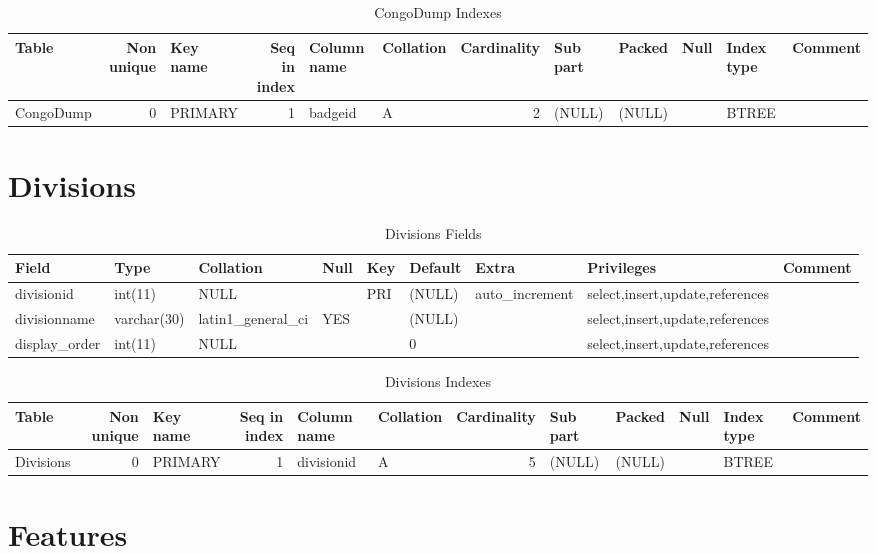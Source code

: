 \documentclass[captions=tablesignature]{scrartcl}
\begin{document}
\begin{table}[htb]
\caption{\label{tbl:congodumpindexes}CongoDump Indexes}
\centering
\begin{tabular}{lrlrllrlllll}
\hline
Table & Non unique & Key name & Seq in index & Column name & Collation & Cardinality & Sub part & Packed & Null & Index type & Comment\\
\hline
CongoDump & 0 & PRIMARY & 1 & badgeid & A & 2 & (NULL) & (NULL) &  & BTREE & \\
\hline
\end{tabular}
\end{table}
\section{Divisions}
\label{sec-2}

\begin{table}[htb]
\caption{\label{tbl:divisionsfields}Divisions Fields}
\centering
\begin{tabular}{lllllllll}
\hline
Field & Type & Collation & Null & Key & Default & Extra & Privileges & Comment\\
\hline
divisionid & int(11) & NULL &  & PRI & (NULL) & auto\_increment & select,insert,update,references & \\
divisionname & varchar(30) & latin1\_general\_ci & YES &  & (NULL) &  & select,insert,update,references & \\
display\_order & int(11) & NULL &  &  & 0 &  & select,insert,update,references & \\
\hline
\end{tabular}
\end{table}

\begin{table}[htb]
\caption{\label{tbl:Divisionsindexes}Divisions Indexes}
\centering
\begin{tabular}{lrlrllrlllll}
\hline
Table & Non unique & Key name & Seq in index & Column name & Collation & Cardinality & Sub part & Packed & Null & Index type & Comment\\
\hline
Divisions & 0 & PRIMARY & 1 & divisionid & A & 5 & (NULL) & (NULL) &  & BTREE & \\
\hline
\end{tabular}
\end{table}
\section{Features}
\label{sec-3}
\end{document}

